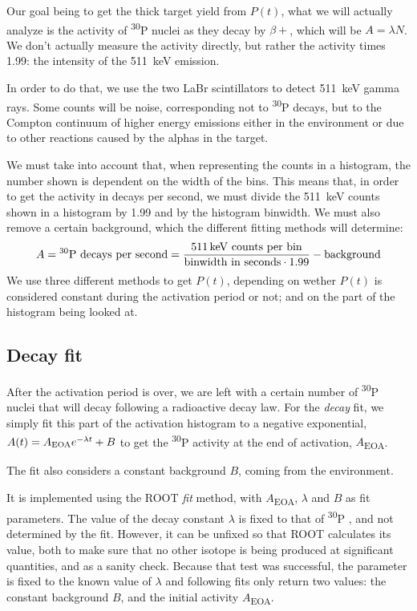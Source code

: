 \documentclass[a4paper,12pt]{report}
\newcommand{\Piso}{\textsuperscript{30}P }
\begin{document}
Our goal being to get the thick target yield from $P(t)$, what we will actually analyze is the activity of \Piso nuclei as they decay by $\beta +$, which will be $A = \lambda N$.
We don't actually measure the activity directly, but rather the activity times \num{1.99}: the intensity of the \qty{511}{\keV} emission.	%

In order to do that, we use the two LaBr scintillators to detect \qty{511}{\keV} gamma rays.
Some counts will be noise, corresponding not to \Piso decays, but to the Compton continuum of higher energy emissions either in the environment or due to other reactions caused by the alphas in the target.

We must take into account that, when representing the counts in a histogram, the number shown is dependent on the width of the bins.
This means that, in order to get the activity in decays per second, we must divide the \qty{511}{\keV} counts shown in a histogram by \num{1.99} and by the histogram binwidth.
We must also remove a certain background, which the different fitting methods will determine:
\begin{equation}
	A = \text{\Piso decays per second} = \frac{\text{\qty{511}{\keV} counts per bin}}{\text{binwidth in seconds}\cdot\num{1.99}} - \text{background}
\end{equation}
We use three different methods to get $P(t)$, depending on wether $P(t)$ is considered constant during the activation period or not; and on the part of the histogram being looked at.

\subsection{Decay fit}
After the activation period is over, we are left with a certain number of \Piso nuclei that will decay following a radioactive decay law.
For the \textit{decay} fit, we simply fit this part of the activation histogram to a negative exponential, $A(t) = A\textsubscript{EOA} e^{-\lambda t} + B$ to get the \Piso activity at the end of activation, $A$\textsubscript{EOA}.

The fit also considers a constant background $B$, coming from the environment.

It is implemented using the ROOT \textit{fit} method, with $A$\textsubscript{EOA}, $\lambda$ and $B$ as fit parameters.
The value of the decay constant $\lambda$ is fixed to that of \Piso, and not determined by the fit.
However, it can be unfixed so that ROOT calculates its value, both to make sure that no other isotope is being produced at significant quantities, and as a sanity check.
Because that test was successful, the parameter is fixed to the known value of $\lambda$ and following fits only return two values: the constant background $B$, and the initial activity $A$\textsubscript{EOA}.
\\
\end{document}
